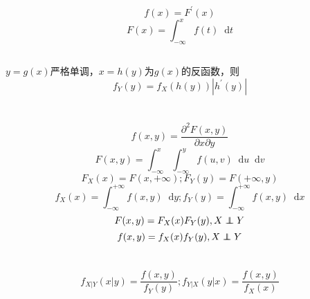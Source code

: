 \documentclass[]{article}
\newcommand*{\dif}{\mathop{}\!\mathrm{d}}
\numberwithin{equation}{section}
\newcommand\independent{\protect\mathpalette{\protect\independenT}{\perp}}
\def\independenT#1#2{\mathrel{\rlap{$#1#2$}\mkern2mu{#1#2}}}
\begin{document}
\section{}
\begin{equation}
    f(x)=F^{'}(x)
\end{equation}
\begin{equation}
    F(x)=\int_{-\infty}^x f(t)\dif t
\end{equation}
\subsection{}
$y=g(x)$严格单调，$x=h(y)$为$g(x)$的反函数，则
\begin{equation}
    f_Y(y)=f_X(h(y))\left|h^{'}(y)\right|
\end{equation}

\section{}
\begin{equation}
    f(x,y)=\frac{\partial^2F(x,y)}{\partial x\partial y}
\end{equation}
\begin{equation}
    F(x,y)=\int_{-\infty}^x\int_{-\infty}^y f(u,v)\dif u\dif v
\end{equation}
\begin{equation}
    F_X(x)=F(x,+\infty);F_Y(y)=F(+\infty,y)
\end{equation}
\begin{equation}
    f_X(x)=\int_{-\infty}^{+\infty}f(x,y)\dif y;f_Y(y)=\int_{-\infty}^{+\infty}f(x,y)\dif x
\end{equation}
\begin{equation}
    F(x,y)=F_X(x)F_Y(y),X\independent Y
\end{equation}
\begin{equation}
    f(x,y)=f_X(x)f_Y(y),X\independent Y
\end{equation}

\section{}
\begin{equation}
    f_{X|Y}(x|y)=\frac{f(x,y)}{f_Y(y)};f_{Y|X}(y|x)=\frac{f(x,y)}{f_X(x)}
\end{equation}

\section{}
\end{document}
